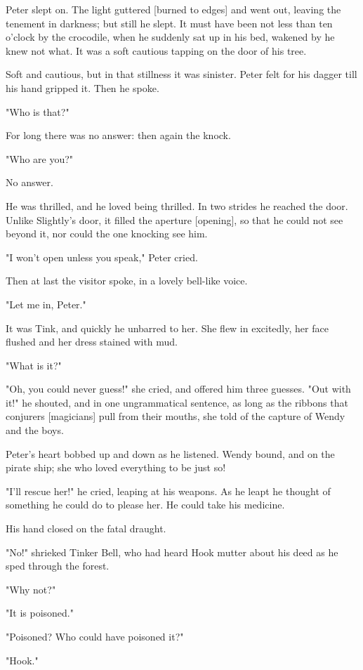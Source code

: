 Peter slept on. The light guttered [burned to edges] and went out, leaving
the tenement in darkness; but still he slept. It must have been not less
than ten o'clock by the crocodile, when he suddenly sat up in his bed,
wakened by he knew not what. It was a soft cautious tapping on the door of
his tree.


Soft and cautious, but in that stillness it was sinister. Peter felt for
his dagger till his hand gripped it. Then he spoke.


"Who is that?"


For long there was no answer: then again the knock.


"Who are you?"


No answer.


He was thrilled, and he loved being thrilled. In two strides he reached
the door. Unlike Slightly's door, it filled the aperture [opening], so
that he could not see beyond it, nor could the one knocking see him.


"I won't open unless you speak," Peter cried.


Then at last the visitor spoke, in a lovely bell-like voice.


"Let me in, Peter."


It was Tink, and quickly he unbarred to her. She flew in excitedly, her
face flushed and her dress stained with mud.


"What is it?"


"Oh, you could never guess!" she cried, and offered him three guesses.
"Out with it!" he shouted, and in one ungrammatical sentence, as long as
the ribbons that conjurers [magicians] pull from their mouths, she told of
the capture of Wendy and the boys.


Peter's heart bobbed up and down as he listened. Wendy bound, and on the
pirate ship; she who loved everything to be just so!


"I'll rescue her!" he cried, leaping at his weapons. As he leapt he
thought of something he could do to please her. He could take his
medicine.


His hand closed on the fatal draught.


"No!" shrieked Tinker Bell, who had heard Hook mutter about his deed as he
sped through the forest.


"Why not?"


"It is poisoned."


"Poisoned? Who could have poisoned it?"


"Hook."


